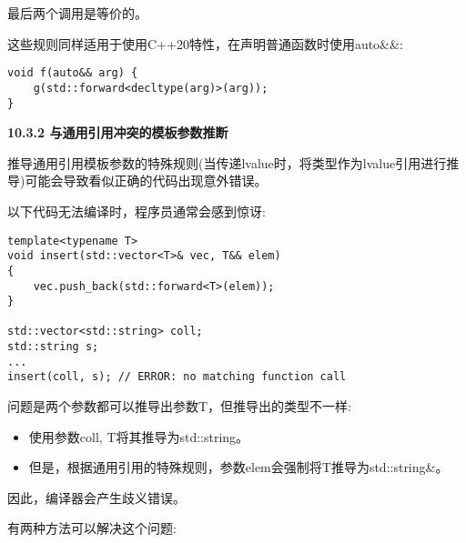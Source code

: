 最后两个调用是等价的。\par

这些规则同样适用于使用C++20特性，在声明普通函数时使用auto\&\&:\par

\begin{lstlisting}[caption={}]
void f(auto&& arg) {
	g(std::forward<decltype(arg)>(arg));
}
\end{lstlisting}

\hspace*{\fill} \par %
\textbf{10.3.2 与通用引用冲突的模板参数推断}

推导通用引用模板参数的特殊规则(当传递lvalue时，将类型作为lvalue引用进行推导)可能会导致看似正确的代码出现意外错误。\par

以下代码无法编译时，程序员通常会感到惊讶:\par

\begin{lstlisting}[caption={}]
template<typename T>
void insert(std::vector<T>& vec, T&& elem)
{
	vec.push_back(std::forward<T>(elem));
}

std::vector<std::string> coll;
std::string s;
...
insert(coll, s); // ERROR: no matching function call
\end{lstlisting}

问题是两个参数都可以推导出参数T，但推导出的类型不一样:\par

\begin{itemize}
	\item 使用参数coll, T将其推导为std::string。
	\item 但是，根据通用引用的特殊规则，参数elem会强制将T推导为std::string\&。
\end{itemize}

因此，编译器会产生歧义错误。\par

有两种方法可以解决这个问题:\par

